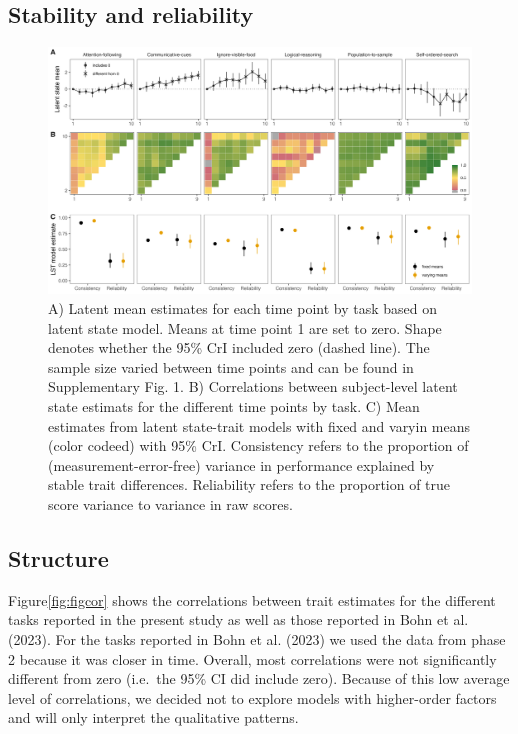 \documentclass[
  man,floatsintext]{apa6}
\begin{document}
\hypertarget{stability-and-reliability}{%
\subsection{Stability and reliability}\label{stability-and-reliability}}

\begin{figure}

{\centering \includegraphics[width=1\linewidth]{../visuals/ls_lst} 

}

\caption{A) Latent mean estimates for each time point by task based on latent state model. Means at time point 1 are set to zero. Shape denotes whether the 95\% CrI included zero (dashed line). The sample size varied between time points and can be found in Supplementary Fig. 1.  B) Correlations between subject-level latent state estimats for the different time points by task. C) Mean estimates from latent state-trait models with fixed and varyin means (color codeed) with 95\% CrI. Consistency refers to the proportion of (measurement-error-free) variance in performance explained by stable trait differences. Reliability refers to the proportion of true score variance to variance in raw scores.}\label{fig:figsem}
\end{figure}

\hypertarget{structure}{%
\subsection{Structure}\label{structure}}

Figure\ref{fig:figcor} shows the correlations between trait estimates for the different tasks reported in the present study as well as those reported in Bohn et al. (2023). For the tasks reported in Bohn et al. (2023) we used the data from phase 2 because it was closer in time. Overall, most correlations were not significantly different from zero (i.e.~the 95\% CI did include zero). Because of this low average level of correlations, we decided not to explore models with higher-order factors and will only interpret the qualitative patterns.
\end{document}
